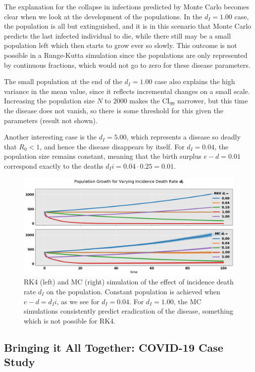 \documentclass[]{article}
\begin{document}
The explanation for the collapse in infections predicted by Monte Carlo becomes clear when we look at the development of the populations. In the $d_I=1.00$ case, the population is all but extinguished, and it is in this scenario that Monte Carlo predicts the last infected individual to die, while there still may be a small population left which then starts to grow ever so slowly. This outcome is not possible in a Runge-Kutta simulation since the populations are only represented by continuous fractions, which would not go to zero for these disease parameters.

The small population at the end of the $d_I=1.00$ case also explains the high variance in the mean value, since it reflects incremental changes on a small scale. Increasing the population size $N$ to 2000 makes the CI$_{99}$ narrower, but this time the disease does not vanish, so there is some threshold for this given the parameters (result not shown).

Another interesting case is the $d_I=5.00$, which represents a disease so deadly that $R_0 < 1$, and hence the disease disappears by itself. For $d_I=0.04$, the population size remains constant, meaning that the birth surplus $e-d = 0.01$ correspond exactly to the deaths $d_Ii = 0.04 \cdot 0.25 = 0.01$.


\begin{figure}[!h]
	\centering
	\includegraphics[width=1\linewidth]{./figs/dynamic-pop-pop-growth.png}
	\caption{RK4 (left) and MC (right) simulation of the effect of incidence death rate $d_I$ on the population. Constant population is achieved when $e-d=d_Ii$, as we see for $d_I=0.04$. For $d_I=1.00$, the MC simulations consistently predict eradication of the disease, something which is not possible for RK4.}
	\label{fig:dynamic-pop-pop-growth}
\end{figure}



\subsection{Bringing it All Together: COVID-19 Case Study} \label{sec:case-study}
\end{document}
